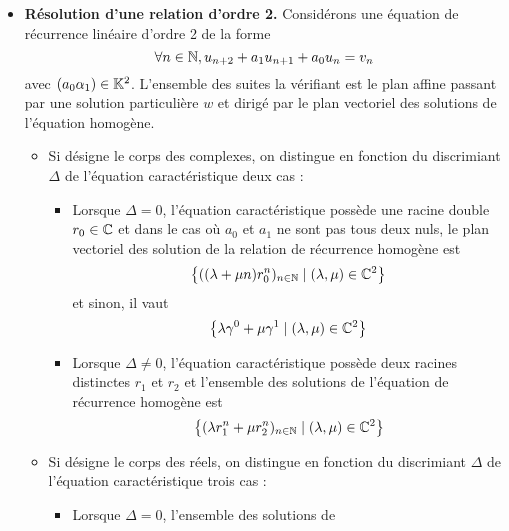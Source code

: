 \documentclass{article}
\begin{document}
\begin{question_kholle}
\begin{itemize}
    \item \textbf{Résolution d’une relation d’ordre 2.}
          Considérons une équation de récurrence linéaire d’ordre 2 de la forme
          \[
            \forall n\in\mathbb N, u_{n+2}+a_{1}u_{n+1}+a_{0}u_{n} = v_{n}
          \]
          avec $(a_{0}\alpha_{1})\in\mathbb K^{2}$. L’ensemble des suites la
          vérifiant est le plan affine passant par une solution
          particulière $w$ et dirigé par le plan vectoriel des solutions
          de l’équation homogène.
          \begin{itemize}
            \item Si \K désigne le corps des complexes, on distingue en
                  fonction du discrimiant $\Delta$ de l’équation
                  caractéristique deux cas :
                  \begin{itemize}
                    \item Lorsque $\Delta=0$, l’équation caractéristique
                          possède une racine double $r_{0}\in\mathbb C$ et dans le cas
                          où $a_{0}$ et $a_{1}$ ne sont pas tous deux nuls, le
                          plan vectoriel des solution de la relation de
                          récurrence homogène est
                          \[
                            \left\{((\lambda+\mu n)r_{0}^{n})_{n\in\mathbb N} \mid
                            (\lambda,\mu)\in\mathbb C^{2}\right\}
                          \]
                          et sinon, il vaut
                          \[
                            \left\{\lambda \gamma^{0} + \mu \gamma^{1} \mid
                            (\lambda, \mu)\in\mathbb C^{2}\right\}
                          \]
                    \item Lorsque $\Delta\neq 0$, l’équation caractéristique
                          possède deux racines distinctes $r_{1}$ et $r_{2}$ et
                          l’ensemble des solutions de l’équation de récurrence homogène est
                          \[
                            \left\{(\lambda r_{1}^{n}+ \mu r_{2}^{n})_{n\in\mathbb N}
                            \mid (\lambda, \mu)\in\mathbb C^{2}\right\}
                          \]
                  \end{itemize}
            \item Si \K désigne le corps des réels, on distingue en
                  fonction du discrimiant $\Delta$ de l’équation
                  caractéristique trois cas :
                  \begin{itemize}
                    \item Lorsque $\Delta=0$, l’ensemble des solutions de

\end{itemize}
\end{itemize}
\end{itemize}
\end{question_kholle}
\end{document}
